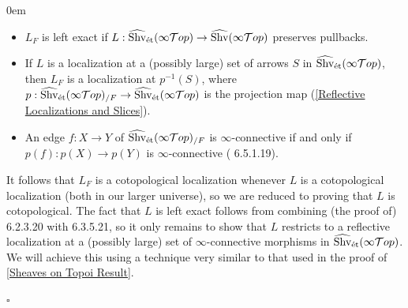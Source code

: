 \documentclass[10pt]{article}
\newcommand{\cT}{\mathcal{T}}
\renewcommand{\qed}{\hfill$\square$}
\renewenvironment{proof}{\begin{addmargin}[1em]{0em}\begin{newproof}}{\end{newproof}\end{addmargin}\qed}
\theoremstyle{witharg}
\theoremstyle{witharg}
\theoremstyle{witharg2}
\begin{document}
\begin{proof}
\begin{itemize}

    \item [$(\textnormal{a})$] $L_F$ is left exact if $L:\widehat{\textnormal{Shv}}_{\textnormal{\'{e}t}}(\infty\cT op)\rightarrow \widehat{\textnormal{Shv}}(\infty\cT op)$ preserves pullbacks.

    \item [$(\textnormal{b})$] If $L$ is a localization at a (possibly large) set of arrows $S$ in $\widehat{\textnormal{Shv}}_{\textnormal{\'{e}t}}(\infty\cT op)$, then $L_F$ is a localization at $p^{-1}(S)$, where $p:\widehat{\textnormal{Shv}}_{\textnormal{\'{e}t}}(\infty\cT op)_{/F}\rightarrow \widehat{\textnormal{Shv}}_{\textnormal{\'{e}t}}(\infty\cT op)$ is the projection map (\ref{Reflective Localizations and Slices}).

    \item [$(\textnormal{c})$] An edge $f:X\rightarrow Y$ of $\widehat{\textnormal{Shv}}_{\textnormal{\'{e}t}}(\infty\cT op)_{/F}$ is $\infty$-connective if and only if $p(f):p(X)\rightarrow p(Y)$ is $\infty$-connective ( 6.5.1.19).
    
\end{itemize}

\noindent It follows that $L_F$ is a cotopological localization whenever $L$ is a cotopological localization (both in our larger universe), so we are reduced to proving that $L$ is cotopological. The fact that $L$ is left exact follows from combining (the proof of)  6.2.3.20 with  6.3.5.21, so it only remains to show that $L$ restricts to a reflective localization at a (possibly large) set of $\infty$-connective morphisms in $\widehat{\textnormal{Shv}}_{\textnormal{\'{e}t}}(\infty\cT op)$. We will achieve this using a technique very similar to that used in the proof of \ref{Sheaves on Topoi Result}. 


\end{proof}
\end{document}
